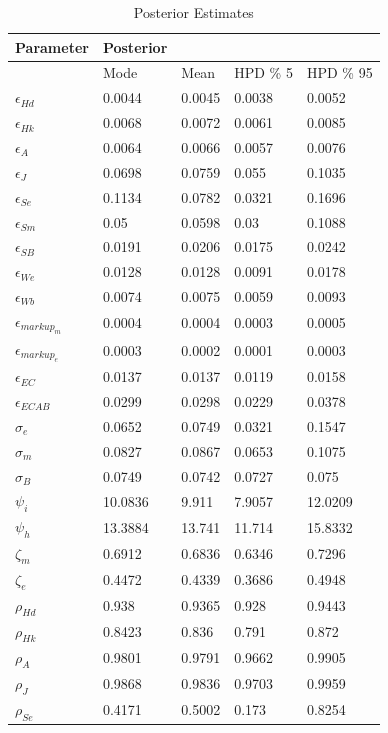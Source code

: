 \documentclass[12pt]{article}
\numberwithin{equation}{section}
\begin{document}
\begin{table}[H]
\caption{Posterior Estimates}
\label{posterior_dist_table}
\begin{tabular}{l||llll}
Parameter & Posterior &  &  &  \\
\hline
\hline
 & Mode & Mean & HPD \% 5 & HPD \% 95 \\
$\epsilon_{Hd}$ & 0.0044 & 0.0045 & 0.0038 & 0.0052 \\
$\epsilon_{Hk}$ & 0.0068 & 0.0072 & 0.0061 & 0.0085 \\
$\epsilon_{A}$ & 0.0064 & 0.0066 & 0.0057 & 0.0076 \\
$\epsilon_{J}$ & 0.0698 & 0.0759 & 0.055 & 0.1035 \\
$\epsilon_{Se}$ & 0.1134 & 0.0782 & 0.0321 & 0.1696 \\
$\epsilon_{Sm}$ & 0.05 & 0.0598 & 0.03 & 0.1088 \\
$\epsilon_{SB}$ & 0.0191 & 0.0206 & 0.0175 & 0.0242 \\
$\epsilon_{We}$ & 0.0128 & 0.0128 & 0.0091 & 0.0178 \\
$\epsilon_{Wb}$ & 0.0074 & 0.0075 & 0.0059 & 0.0093 \\
$\epsilon_{markup_m}$ & 0.0004 & 0.0004 & 0.0003 & 0.0005 \\
$\epsilon_{markup_e}$ & 0.0003 & 0.0002 & 0.0001 & 0.0003 \\
$\epsilon_{EC}$ & 0.0137 & 0.0137 & 0.0119 & 0.0158 \\
$\epsilon_{ECAB}$ & 0.0299 & 0.0298 & 0.0229 & 0.0378 \\
$\sigma_e$ & 0.0652 & 0.0749 & 0.0321 & 0.1547 \\
$\sigma_m$ & 0.0827 & 0.0867 & 0.0653 & 0.1075 \\
$\sigma_B$ & 0.0749 & 0.0742 & 0.0727 & 0.075 \\
$\psi_i$ & 10.0836 & 9.911 & 7.9057 & 12.0209 \\
$\psi_h$ & 13.3884 & 13.741 & 11.714 & 15.8332 \\
$\zeta_m$ & 0.6912 & 0.6836 & 0.6346 & 0.7296 \\
$\zeta_e$ & 0.4472 & 0.4339 & 0.3686 & 0.4948 \\
$\rho_{Hd}$ & 0.938 & 0.9365 & 0.928 & 0.9443 \\
$\rho_{Hk}$ & 0.8423 & 0.836 & 0.791 & 0.872 \\
$\rho_{A}$ & 0.9801 & 0.9791 & 0.9662 & 0.9905 \\
$\rho_{J}$ & 0.9868 & 0.9836 & 0.9703 & 0.9959 \\
$\rho_{Se}$ & 0.4171 & 0.5002 & 0.173 & 0.8254 \\

\end{tabular}
\end{table}
\end{document}
